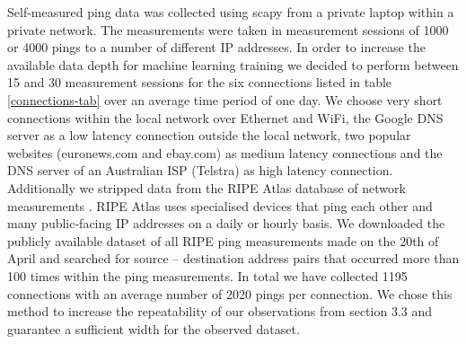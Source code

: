 \documentclass[12pt,a4paper,automark, toc=bib]{scrreprt}
\theoremstyle{definition}
\begin{document}
			Self-measured ping data was collected using scapy \cite{scapy} from a private laptop within a private network. The measurements were taken in measurement sessions of 1000 or 4000 pings to a number of different IP addresses. In order to increase the available data depth for machine learning training we decided to perform between 15 and 30 measurement sessions for the six connections listed in table \ref{connections-tab} over an average time period of one day. We choose very short connections within the local network over Ethernet and WiFi, the Google DNS server as a low latency connection outside the local network, two popular websites (euronews.com and ebay.com) as medium latency connections and the DNS server of an Australian ISP (Telstra) as high latency connection. 
			\pagebreak\\
			Additionally we stripped data from the RIPE Atlas database of network measurements \cite{RIPE}. RIPE Atlas uses specialised devices that ping each other and many public-facing IP addresses on a daily or hourly basis. We downloaded the publicly available dataset of all RIPE ping measurements made on the 20th of April and searched for source -- destination address pairs that occurred more than 100 times within the ping measurements. In total we have collected 1195 connections with an average number of 2020 pings per connection. We chose this method to increase the repeatability of our observations from section 3.3 and guarantee a sufficient width for the observed dataset. \\
			
\end{document}
